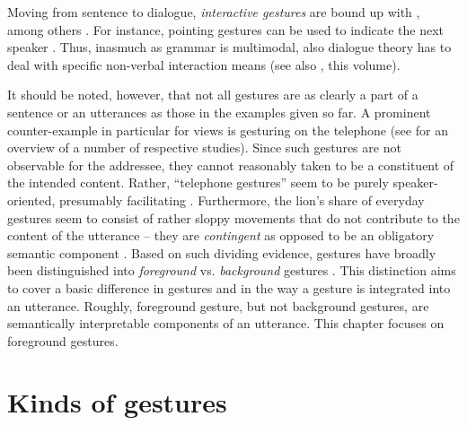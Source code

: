 \documentclass[output=paper]{langsci/langscibook}
\begin{document}
Moving from sentence to dialogue, \emph{interactive gestures}  are bound up with , among others \citep{Bavelas:Chovil:Lawrie:Wade:1992,Bavelas:Chovil:Coates:Roe:1995}.
%
For instance, pointing gestures can be used to indicate the next speaker \citep{Rieser:Poesio:2009}. 
%
Thus, inasmuch as grammar is multimodal, also dialogue theory has to deal with specific non-verbal interaction means (see also , this volume).



It should be noted, however, that not all gestures are as clearly a part of a sentence or an utterances as those in the examples given so far.
%
A prominent counter-example in particular for  views is gesturing on the telephone (see \citet{Bavelas:Gerwing:Sutton:Prevost:2008} for an overview of a number of respective studies).
%
Since such gestures are not observable for the addressee, they cannot reasonably taken to be a constituent of the intended content. 
%
Rather, \enquote{telephone gestures} seem to be purely speaker-oriented, presumably facilitating .
%
Furthermore, the lion's share of everyday gestures seem to consist of rather sloppy movements that do not contribute to the content of the utterance -- they are \emph{contingent}  as opposed to be an obligatory  semantic component \citep{Luecking:2013:a}.
%
Based on such dividing evidence, gestures have broadly been distinguished into \emph{foreground}  vs. \emph{background} gestures  \citep{Cooperrider:2017}. 
%
This distinction aims to cover a basic difference in gestures and in the way a gesture is integrated into an utterance. 
%
Roughly, foreground gesture, but not background gestures, are semantically interpretable components of an utterance.
%
This chapter focuses on foreground gestures.



\section{Kinds of gestures}
\label{sec:kinds-gestures}
\end{document}

